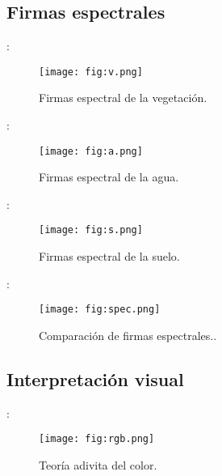\subsection{Firmas espectrales}

\begin{frame}{\secname : \subsecname}
  \begin{figure}
    \centering
    \texttt{[image: fig:v.png]}
    \caption{Firmas espectral de la vegetación.}
    \label{}
  \end{figure}
\end{frame}

\begin{frame}{\secname : \subsecname}
  \begin{figure}
    \centering
    \texttt{[image: fig:a.png]}
    \caption{Firmas espectral de la agua.}
    \label{}
  \end{figure}
\end{frame}

\begin{frame}{\secname : \subsecname}
  \begin{figure}
    \centering
    \texttt{[image: fig:s.png]}
    \caption{Firmas espectral de la suelo.}
    \label{}
  \end{figure}
\end{frame}

\begin{frame}{\secname : \subsecname}
  \begin{figure}
    \centering
    \texttt{[image: fig:spec.png]}
    \caption{Comparación de firmas espectrales..}
    \label{}
  \end{figure}
\end{frame}

\subsection{Interpretación visual}

\begin{frame}{\secname : \subsecname}
  \begin{figure}
    \centering
    \texttt{[image: fig:rgb.png]}
    \caption{Teoría adivita del color.}
    \label{}
  \end{figure}
\end{frame}


